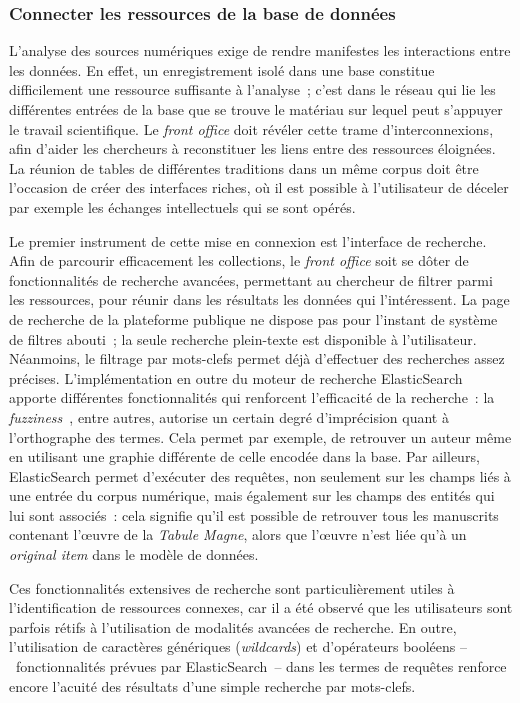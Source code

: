 \documentclass[a4paper,12pt,twoside]{book}
\newcommand{\eng}{\emph}
\newcommand{\oi}{\eng{original item}\xspace}
\newcommand{\fo}{\eng{front office}\xspace}
\newcommand{\g}[1]{\og#1~\fg}
\begin{document}
			\subsubsection{Connecter les ressources de la base de données}
L'analyse des sources numériques exige de rendre manifestes les interactions entre les données. En effet, un enregistrement isolé dans une base constitue difficilement une ressource suffisante à l'analyse~; c'est dans le réseau qui lie les différentes entrées de la base que se trouve le matériau sur lequel peut s'appuyer le travail scientifique. Le \fo doit révéler cette trame d'interconnexions, afin d'aider les chercheurs à reconstituer les liens entre des ressources éloignées. La réunion de tables de différentes traditions dans un même corpus doit être l'occasion de créer des interfaces riches, où il est possible à l'utilisateur de déceler par exemple les échanges intellectuels qui se sont opérés.

Le premier instrument de cette mise en connexion est l'interface de recherche. Afin de parcourir efficacement les collections, le \fo soit se dôter de fonctionnalités de recherche avancées, permettant au chercheur de filtrer parmi les ressources, pour réunir dans les résultats les données qui l'intéressent. La page de recherche de la plateforme publique ne dispose pas pour l'instant de système de filtres abouti~; la seule recherche plein-texte est disponible à l'utilisateur. Néanmoins, le filtrage par mots-clefs permet déjà d'effectuer des recherches assez précises. L'implémentation en outre du moteur de recherche ElasticSearch apporte différentes fonctionnalités qui renforcent l'efficacité de la recherche~: la \g{\eng{fuzziness}}, entre autres, autorise un certain degré d'imprécision quant à l'orthographe des termes. Cela permet par exemple, de retrouver un auteur même en utilisant une graphie différente de celle encodée dans la base. Par ailleurs, ElasticSearch permet d'exécuter des requêtes, non seulement sur les champs liés à une entrée du corpus numérique, mais également sur les champs des entités qui lui sont associés~: cela signifie qu'il est possible de retrouver tous les manuscrits contenant l'œuvre de la \emph{Tabule Magne}, alors que l'œuvre n'est liée qu'à un \oi dans le modèle de données.

Ces fonctionnalités extensives de recherche sont particulièrement utiles à l'identification de ressources connexes, car il a été observé que les utilisateurs sont parfois rétifs à l'utilisation de modalités avancées de recherche. En outre, l'utilisation de caractères génériques (\eng{wildcards}) et d'opérateurs booléens –~fonctionnalités prévues par ElasticSearch~– dans les termes de requêtes renforce encore l'acuité des résultats d'une simple recherche par mots-clefs.
\end{document}
